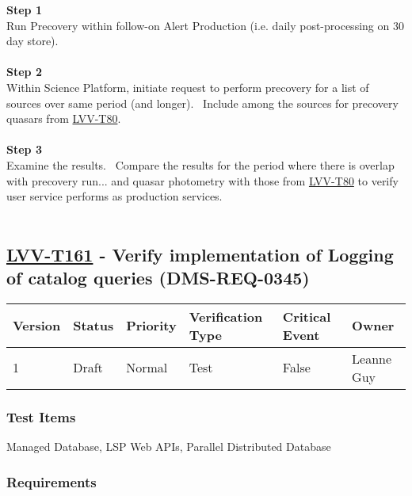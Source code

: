 \textbf{Step 1}\\
Run Precovery within follow-on Alert Production (i.e. daily
post-processing on 30 day store).\\
~\\
\textbf{Step 2}\\
Within Science Platform, initiate request to perform precovery for a
list of sources over same period (and longer). ~Include among the
sources for precovery quasars from
\href{https://jira.lsstcorp.org/secure/Tests.jspa\#/testCase/LVV-T80}{LVV-T80}.~\\
~\\
\textbf{Step 3}\\
Examine the results. ~Compare the results for the period where there is
overlap with precovery run... and quasar photometry with those from
\href{https://jira.lsstcorp.org/secure/Tests.jspa\#/testCase/LVV-T80}{LVV-T80}
to verify user service performs as production services.\\
~\\

\hypertarget{lvv-t161---verify-implementation-of-logging-of-catalog-queries-dms-req-0345}{%
\subsection{\texorpdfstring{\href{https://jira.lsstcorp.org/secure/Tests.jspa\#/testCase/LVV-T161}{LVV-T161}
- Verify implementation of Logging of catalog queries
(DMS-REQ-0345)}{LVV-T161 - Verify implementation of Logging of catalog queries (DMS-REQ-0345)}}\label{lvv-t161---verify-implementation-of-logging-of-catalog-queries-dms-req-0345}}

\begin{longtable}[]{@{}llllll@{}}
\toprule
Version & Status & Priority & Verification Type & Critical Event &
Owner\tabularnewline
\midrule
\endhead
1 & Draft & Normal & Test & False & Leanne Guy\tabularnewline
\bottomrule
\end{longtable}

\hypertarget{test-items-137}{%
\subsubsection{Test Items}\label{test-items-137}}

Managed Database, LSP Web APIs, Parallel Distributed Database~

\hypertarget{requirements-138}{%
\subsubsection{Requirements}\label{requirements-138}}

